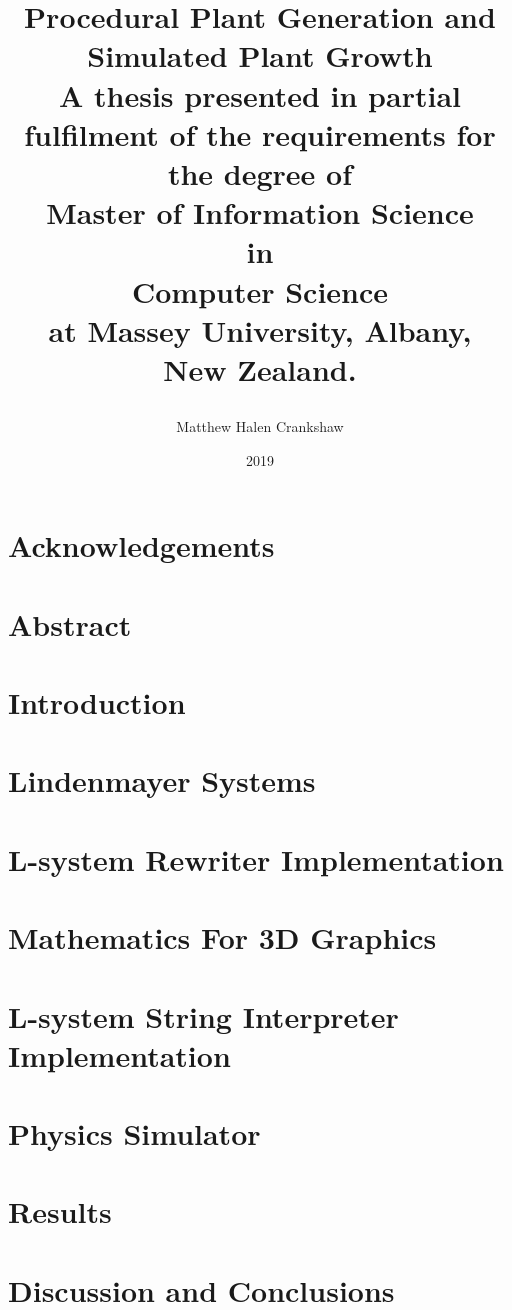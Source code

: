 \documentclass[11pt, twoside]{report}
\title{
{\huge \textbf{Procedural Plant Generation and Simulated Plant Growth }}\\
\vspace{3cm}
{\large A thesis presented in partial fulfilment of the requirements for the degree of \\
\vspace{4cm}
\large \textbf{Master of Information Science}\\
\large \textbf{in}\\
\large \textbf{Computer Science}\\
\vspace{4cm}
\large at Massey University, Albany, \\
\large New Zealand. }
\vspace{3cm}
\author{Matthew Halen Crankshaw}
\date{2019}
}
\begin{document}
\maketitle

\chapter*{Acknowledgements}


\chapter*{Abstract}


\tableofcontents
\listoffigures
\listoftables


\chapter{Introduction}


\chapter{Lindenmayer Systems}  \label{l-system chapter} 


\chapter{L-system Rewriter Implementation}


\chapter{Mathematics For 3D Graphics} \label{maths chapter}


\chapter{L-system String Interpreter Implementation} \label{interpreter implementation}


\chapter{Physics Simulator} \label{physics chapter}


\chapter{Results} \label{results chapter}


\chapter{Discussion and Conclusions}


\printglossary[type=\acronymtype]
\printglossary

\begin{appendices}

\end{appendices}
\end{document}
